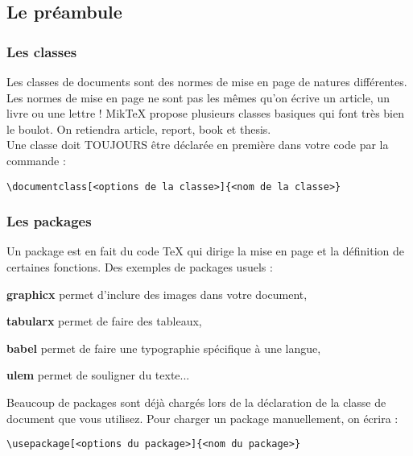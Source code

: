 \documentclass{beamer}
\begin{document}
\subsection[Préamb]{Le préambule}
\begin{frame}[fragile]
	\frametitle{Les classes}
	Les classes de documents sont des normes de mise en page de natures différentes. Les normes de mise en page ne sont pas les mêmes qu'on écrive un article, un livre ou une lettre ! MikTeX propose plusieurs classes basiques qui font très bien le boulot. On retiendra article, report, book et thesis.\\

	Une classe doit \alert{TOUJOURS} être déclarée en première dans votre code par la commande :
\begin{footnotesize}
	\begin{Verbatim}
\documentclass[<options de la classe>]{<nom de la classe>}
	\end{Verbatim}
\end{footnotesize}
\end{frame}


\begin{frame}[fragile]
	\frametitle{Les packages}
	Un package est en fait du code TeX qui dirige la mise en page et la définition de certaines fonctions. Des exemples de packages usuels :
	\begin{description}
		\item{\textbf{graphicx}} permet d'inclure des images dans votre document,
		\item{\textbf{tabularx}} permet de faire des tableaux,
		\item{\textbf{babel}} permet de faire une typographie spécifique à une langue,
		\item{\textbf{ulem}} permet de souligner du texte...
	\end{description}
	Beaucoup de packages sont déjà chargés lors de la déclaration de la classe de document que vous utilisez. Pour charger un package manuellement, on écrira :
	\begin{small}
	\begin{Verbatim}
\usepackage[<options du package>]{<nom du package>}
	\end{Verbatim}
	\end{small}
\end{frame}
\end{document}
